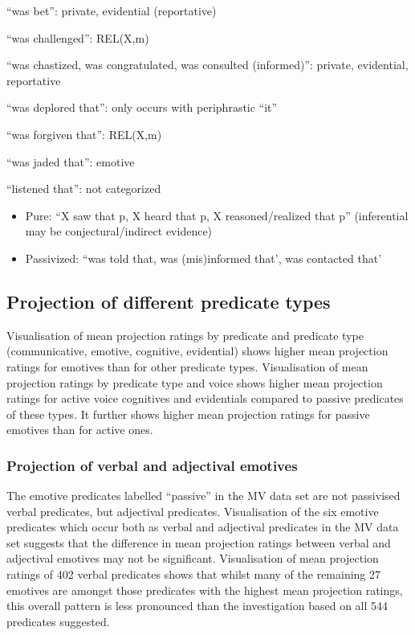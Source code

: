 \documentclass[11pt,fleqn]{article}
\newcommand{\6}{\mbox{$[\hspace*{-.6mm}[$}}
\newcommand{\9}{\mbox{$]\hspace*{-.6mm}]$}}
\begin{document}
\begin{itemize}
\begin{itemize}
``was bet'': private, evidential (reportative)

``was challenged'': REL(X,m)

``was chastized, was congratulated, was consulted (informed)'': private, evidential, reportative

``was deplored that'': only occurs with periphrastic ``it''

``was forgiven that'': REL(X,m)

``was jaded that'': emotive

``listened that'': not categorized

\begin{itemize}

\item Pure: ``X saw that p, X heard that p, X reasoned/realized that p'' (inferential may be conjectural/indirect evidence)

\item Passivized: ``was told that, was (mis)informed that', was contacted that'

\end{itemize}

\end{itemize}

\end{itemize}

\subsection{Projection of different predicate types}

Visualisation of mean projection ratings by predicate and predicate type (communicative, emotive, cognitive, evidential) shows higher mean projection ratings for emotives than for other predicate types. Visualisation of mean projection ratings by predicate type and voice shows higher mean projection ratings for active voice cognitives and evidentials compared to passive predicates of these types. It further shows higher mean projection ratings for passive emotives than for active ones. 

\subsubsection{Projection of verbal and adjectival emotives}

The emotive predicates labelled ``passive'' in the MV data set are not passivised verbal predicates, but adjectival predicates. Visualisation of the six emotive predicates which occur both as verbal and adjectival predicates in the MV data set suggests that the difference in mean projection ratings between verbal and adjectival emotives may not be significant. Visualisation of mean projection ratings of 402 verbal predicates shows that whilst many of the remaining 27 emotives are amongst those predicates with the highest mean projection ratings, this overall pattern is less pronounced than the investigation based on all 544 predicates suggested.
\end{document}
